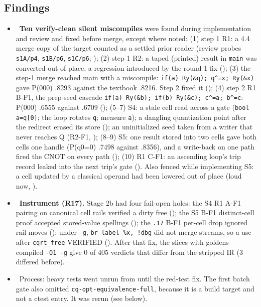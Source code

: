 \subsection*{Findings}
\begin{itemize}[itemsep=1pt]
\item \fconfirmed\ \textbf{Ten verify-clean silent miscompiles} were found during implementation and review and fixed before merge, except where noted:
(1) step 1 R1: a 4.4 merge copy of the target counted as a settled prior reader (review probes \texttt{s1A/p4}, \texttt{s1B/p6}, \texttt{s1C/p6}; );
(2) step 1 R2: a taped (printed) result in \texttt{main} was converted out of place, a regression introduced by the round-1 fix ();
(3) the step-1 merge reached main  with a miscompile: \texttt{if(a) Ry(\&q); q\textasciicircum=x; Ry(\&x)} gave P(000) .8293 against the textbook .8216. Step 2 fixed it ();
(4) step 2 R1 B-F1, the prep-seed cascade \texttt{if(a) Ry(\&b); if(b) Ry(\&c); c\textasciicircum=a; b\textasciicircum=c}: P(000) .6555 against .6709 ();
(5--7) S4: a stale cell read across a gate (\texttt{bool a=q[0]}; the loop rotates \texttt{q}; measure \texttt{a}); a dangling quantization point after the redirect erased its store (); an uninitialized seed taken from a writer that never reaches Q (R2-F1, );
(8--9) S5: one result stored into two cells gave both cells one handle (P(q0=0) .7498 against .8356), and a write-back on one path fired the CNOT on every path ();
(10)  R1 C-F1: an ascending loop's trip record leaked into the next trip's gate ().
Also fenced while implementing S5: a cell updated by a classical operand had been lowered out of place (loud now, ).
\item \fconfirmed\ \textbf{Instrument (R17).} Stage 2b had four fail-open holes:
the S4 R1 A-F1 pairing on canonical cell rails verified a dirty free ();
the S5 B-F1 distinct-cell proof accepted stored-value spellings ();
the \texttt{.17} B-F1 per-cell drop ignored rail moves ();
under \texttt{-g}, \texttt{br label \%x, !dbg} did not merge streams, so a use after \texttt{cqrt\_free} VERIFIED ().
After that fix, the slices with goldens compiled \texttt{-O1 -g} give 0 of 405 verdicts that differ from the stripped IR (3 differed before).
\item \fpreexisting\ Process: heavy tests went unrun from  until the red-test fix. The first batch gate also omitted \texttt{cq-opt-equivalence-full}, because it is a build target and not a ctest entry. It was rerun (see below).

\end{itemize}
